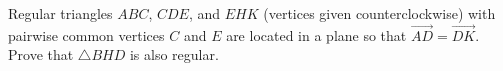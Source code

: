 Regular triangles $ABC$, $CDE$, and $EHK$ (vertices given counterclockwise) with pairwise common vertices $C$ and $E$ are located in a plane so that $\overrightarrow{AD} = \overrightarrow{DK}$. Prove that $\triangle BHD$ is also regular.
